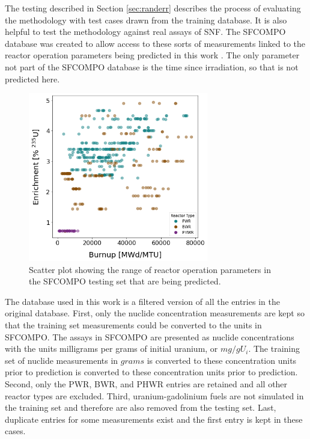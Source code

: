 
The testing described in Section \ref{sec:randerr} describes the process of
evaluating the methodology with test cases drawn from the training database.
It is also helpful to test the methodology against real assays of \gls{SNF}.
The \gls{SFCOMPO} database was created to allow access to these sorts of
measurements linked to the reactor operation parameters being predicted in this
work \cite{sfcompo, valid_sfco}. The only parameter not part of the
\gls{SFCOMPO} database is the time since irradiation, so that is not predicted
here. 

\begin{figure}[!htb]
  \centering
  \includegraphics[width=0.7\textwidth]{./chapters/exp1/sfcompo_scatter_viz.png}
  \caption[Scatter plot of distribution of \acrshort{SFCOMPO} testing set 
           labels]
          {Scatter plot showing the range of reactor operation parameters in 
           the \acrshort{SFCOMPO} testing set that are being predicted.}
  \label{fig:sfcoscatter}
\end{figure}

The database used in this work is a filtered version of all the entries in the
original database. First, only the nuclide concentration measurements are kept
so that the training set measurements could be converted to the units in
\gls{SFCOMPO}.  The assays in \gls{SFCOMPO} are presented as nuclide
concentrations with the units milligrams per grams of initial uranium, or
$mg/gU_i$. The training set of nuclide measurements in $grams$ is converted to
these concentration units prior to prediction is converted to these
concentration units prior to prediction. Second, only the \gls{PWR}, \gls{BWR},
and \gls{PHWR} entries are retained and all other reactor types are excluded.
Third, uranium-gadolinium fuels are not simulated in the training set and
therefore are also removed from the testing set. Last, duplicate entries for
some measurements exist and the first entry is kept in these cases. 

